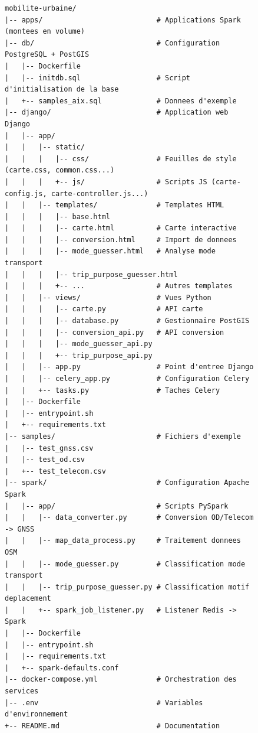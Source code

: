 \documentclass[french]{tai_info} %
\begin{document}
\begin{figure}[htbp]
\begin{minipage}{\textwidth}
\begin{lstlisting}[basicstyle=\small\ttfamily, frame=single, linewidth=\textwidth, xleftmargin=0pt, xrightmargin=0pt, caption={Structure des fichiers du projet}]
mobilite-urbaine/
|-- apps/                           # Applications Spark (montees en volume)
|-- db/                             # Configuration PostgreSQL + PostGIS
|   |-- Dockerfile
|   |-- initdb.sql                  # Script d'initialisation de la base
|   +-- samples_aix.sql             # Donnees d'exemple
|-- django/                         # Application web Django
|   |-- app/
|   |   |-- static/
|   |   |   |-- css/                # Feuilles de style (carte.css, common.css...)
|   |   |   +-- js/                 # Scripts JS (carte-config.js, carte-controller.js...)
|   |   |-- templates/              # Templates HTML
|   |   |   |-- base.html
|   |   |   |-- carte.html          # Carte interactive
|   |   |   |-- conversion.html     # Import de donnees
|   |   |   |-- mode_guesser.html   # Analyse mode transport
|   |   |   |-- trip_purpose_guesser.html
|   |   |   +-- ...                 # Autres templates
|   |   |-- views/                  # Vues Python
|   |   |   |-- carte.py            # API carte
|   |   |   |-- database.py         # Gestionnaire PostGIS
|   |   |   |-- conversion_api.py   # API conversion
|   |   |   |-- mode_guesser_api.py
|   |   |   +-- trip_purpose_api.py
|   |   |-- app.py                  # Point d'entree Django
|   |   |-- celery_app.py           # Configuration Celery
|   |   +-- tasks.py                # Taches Celery
|   |-- Dockerfile
|   |-- entrypoint.sh
|   +-- requirements.txt
|-- samples/                        # Fichiers d'exemple
|   |-- test_gnss.csv
|   |-- test_od.csv
|   +-- test_telecom.csv
|-- spark/                          # Configuration Apache Spark
|   |-- app/                        # Scripts PySpark
|   |   |-- data_converter.py       # Conversion OD/Telecom -> GNSS
|   |   |-- map_data_process.py     # Traitement donnees OSM
|   |   |-- mode_guesser.py         # Classification mode transport
|   |   |-- trip_purpose_guesser.py # Classification motif deplacement
|   |   +-- spark_job_listener.py   # Listener Redis -> Spark
|   |-- Dockerfile
|   |-- entrypoint.sh
|   |-- requirements.txt
|   +-- spark-defaults.conf
|-- docker-compose.yml              # Orchestration des services
|-- .env                            # Variables d'environnement
+-- README.md                       # Documentation
\end{lstlisting}
\end{minipage}
\end{figure}
\end{document}
